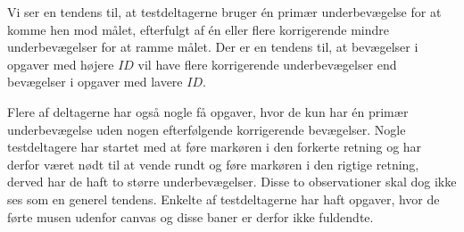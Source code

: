 Vi ser en tendens til, at testdeltagerne bruger én primær underbevægelse for at komme hen mod målet, efterfulgt af én eller flere korrigerende mindre underbevægelser for at ramme målet. Der er en tendens til, at bevægelser i opgaver med højere $ID$ vil have flere korrigerende underbevægelser end bevægelser i opgaver med lavere $ID$. 

Flere af deltagerne har også nogle få opgaver, hvor de kun har én primær underbevægelse uden nogen efterfølgende korrigerende bevægelser. Nogle testdeltagere har startet med at føre markøren i den forkerte retning og har derfor været nødt til at vende rundt og føre markøren i den rigtige retning, derved har de haft to større underbevægelser. Disse to observationer skal dog ikke ses som en generel tendens. Enkelte af testdeltagerne har haft opgaver, hvor de førte musen udenfor canvas og disse baner er derfor ikke fuldendte.

